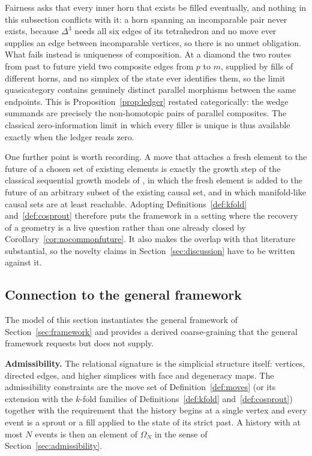 \begin{remark}
\label{rem:limitpaths}
Fairness asks that every inner horn that exists be filled eventually, and nothing in this subsection conflicts with it: a horn spanning an incomparable pair never exists, because $\Delta^3$ needs all six edges of its tetrahedron and no move ever supplies an edge between incomparable vertices, so there is no unmet obligation.
What fails instead is uniqueness of composition.
At a diamond the two routes from past to future yield two composite edges from $p$ to $m$, supplied by fills of different horns, and no simplex of the state ever identifies them, so the limit quasicategory contains genuinely distinct parallel morphisms between the same endpoints.
This is Proposition~\ref{prop:ledger} restated categorically: the wedge summands are precisely the non-homotopic pairs of parallel composites.
The classical zero-information limit in which every filler is unique is thus available exactly when the ledger reads zero.
\end{remark}

One further point is worth recording.
A move that attaches a fresh element to the future of a chosen set of existing elements is exactly the growth step of the classical sequential growth models of \citet{rideout2000csg}, in which the fresh element is added to the future of an arbitrary subset of the existing causal set, and in which manifold-like causal sets are at least reachable.
Adopting Definitions~\ref{def:kfold} and~\ref{def:cosprout} therefore puts the framework in a setting where the recovery of a geometry is a live question rather than one already closed by Corollary~\ref{cor:nocommonfuture}.
It also makes the overlap with that literature substantial, so the novelty claims in Section~\ref{sec:discussion} have to be written against it.

\subsection{Connection to the general framework}
\label{sec:bridge}

The model of this section instantiates the general framework of
Section~\ref{sec:framework} and provides a derived coarse-graining that
the general framework requests but does not supply.

\textbf{Admissibility.}
The relational signature is the simplicial structure itself: vertices,
directed edges, and higher simplices with face and degeneracy maps.
The admissibility constraints are the move set of
Definition~\ref{def:moves} (or its extension with the $k$-fold families of
Definitions~\ref{def:kfold} and~\ref{def:cosprout}) together with the
requirement that the history begins at a single vertex and every event is
a sprout or a fill applied to the state of its strict past.
A history with at most $N$ events is then an element of $\Omega_N$ in
the sense of Section~\ref{sec:admissibility}.

